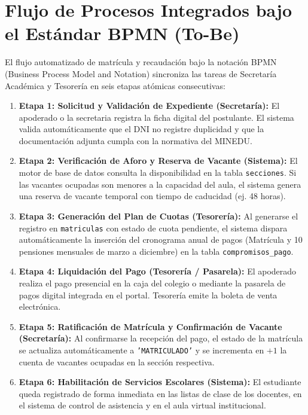 \documentclass[12pt,a4paper,oneside]{report}
\begin{document}
\section{Flujo de Procesos Integrados bajo el Estándar BPMN (To-Be)}

El flujo automatizado de matrícula y recaudación bajo la notación BPMN (Business Process Model and Notation) sincroniza las tareas de Secretaría Académica y Tesorería en seis etapas atómicas consecutivas:

\begin{enumerate}
    \item \textbf{Etapa 1: Solicitud y Validación de Expediente (Secretaría):} El apoderado o la secretaria registra la ficha digital del postulante. El sistema valida automáticamente que el DNI no registre duplicidad y que la documentación adjunta cumpla con la normativa del MINEDU.
    \item \textbf{Etapa 2: Verificación de Aforo y Reserva de Vacante (Sistema):} El motor de base de datos consulta la disponibilidad en la tabla \texttt{secciones}. Si las vacantes ocupadas son menores a la capacidad del aula, el sistema genera una reserva de vacante temporal con tiempo de caducidad (ej. 48 horas).
    \item \textbf{Etapa 3: Generación del Plan de Cuotas (Tesorería):} Al generarse el registro en \texttt{matriculas} con estado de cuota pendiente, el sistema dispara automáticamente la inserción del cronograma anual de pagos (Matrícula y 10 pensiones mensuales de marzo a diciembre) en la tabla \texttt{compromisos\_pago}.
    \item \textbf{Etapa 4: Liquidación del Pago (Tesorería / Pasarela):} El apoderado realiza el pago presencial en la caja del colegio o mediante la pasarela de pagos digital integrada en el portal. Tesorería emite la boleta de venta electrónica.
    \item \textbf{Etapa 5: Ratificación de Matrícula y Confirmación de Vacante (Secretaría):} Al confirmarse la recepción del pago, el estado de la matrícula se actualiza automáticamente a \texttt{'MATRICULADO'} y se incrementa en $+1$ la cuenta de vacantes ocupadas en la sección respectiva.
    \item \textbf{Etapa 6: Habilitación de Servicios Escolares (Sistema):} El estudiante queda registrado de forma inmediata en las listas de clase de los docentes, en el sistema de control de asistencia y en el aula virtual institucional.
\end{enumerate}
\end{document}
